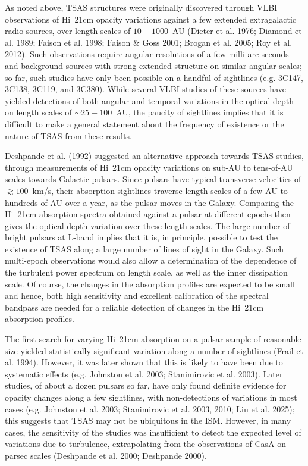 \documentclass[11pt]{article}
\newcommand{\hi}{H{\sc i}}
\begin{document}
\vskip 0.15in
\noindent {\color{royalblue} \large \bf \hi~21cm absorption studies towards a large pulsar sample}
\vskip 0.05in

As noted above, TSAS structures were originally discovered through VLBI observations of \hi~21cm opacity variations against a few extended extragalactic radio sources, over length scales of $10-1000$~AU (Dieter et al. 1976; Diamond et al. 1989; Faison et al. 1998; Faison \& Goss 2001; Brogan et al. 2005; Roy et al. 2012). Such observations require angular resolutions of a few milli-arc seconds and background sources with strong extended structure on similar angular scales; so far, such studies have only been possible on a handful of sightlines (e.g. 3C147, 3C138, 3C119, and 3C380). While several VLBI studies of these sources have yielded detections of both angular and temporal variations in the optical depth on length scales of $\sim 25-100$~AU, the paucity of sightlines implies that it is difficult to make a general statement about the frequency of existence or the nature of TSAS from these results. 

Deshpande et al. (1992) suggested an alternative approach towards TSAS studies, through measurements of \hi~21cm opacity variations on sub-AU to tens-of-AU scales towards Galactic pulsars. Since pulsars have typical transverse velocities of $\gtrsim 100$~km/s, their absorption sightlines traverse length scales of a few AU to hundreds of AU over a year, as the pulsar moves in the Galaxy. Comparing the \hi~21cm absorption spectra obtained against a pulsar at different epochs then gives the optical depth variation over these length scales. The large number of bright pulsars at L-band implies that it is, in principle, possible to test the existence of TSAS along a large number of lines of sight in the Galaxy. Such multi-epoch observations would also allow a determination of the dependence of the turbulent power spectrum on length scale, as well as the inner dissipation scale. Of course, the changes in the absorption profiles are expected to be small and hence, both high sensitivity and excellent calibration of the spectral bandpass are needed for a reliable detection of changes in the \hi~21cm absorption profiles.

The first search for varying \hi~21cm absorption on a pulsar sample of reasonable size yielded statistically-significant variation along a number of sightlines (Frail et al. 1994). However, it was later shown that this is likely to have been due to systematic effects (e.g. Johnston et al. 2003; Stanimirovic et al. 2003). Later studies, of about a dozen pulsars so far, have only found definite evidence for opacity changes along a few sightlines, with non-detections of variations in most cases (e.g. Johnston et al. 2003; Stanimirovic et al. 2003, 2010; Liu et al. 2025); this suggests that TSAS may not be ubiquitous in the ISM. However, in many cases, the sensitivity of the studies was insufficient to detect the expected level of variations due to turbulence, extrapolating from the observations of CasA on parsec scales (Deshpande et al. 2000; Deshpande 2000).
\end{document}
